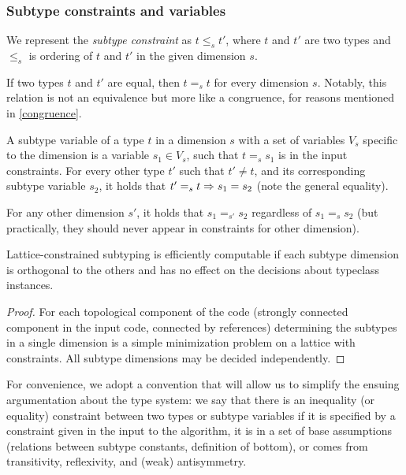 \subsubsection{Subtype constraints and variables}

We represent the \emph{subtype constraint} as $t \leq_s t'$, where $t$ and $t'$ are two types and $\leq_s$ is ordering of $t$ and $t'$ in the given dimension $s$.

If two types $t$ and $t'$ are equal, then $t =_s t$ for every dimension $s$. Notably, this relation is not an equivalence but more like a congruence, for reasons mentioned in \cref{congruence}.

\begin{defn}
    A subtype variable of a type $t$ in a dimension $s$ with a set of variables $V_s$ specific to the dimension is a variable $s_1 \in V_s$, such that $t =_s s_1$ is in the input constraints. For every other type $t'$ such that $t' \neq t$, and its corresponding subtype variable $s_2$, it holds that $t' =_s t \Rightarrow s_1 = s_2$ (note the general equality).
\end{defn}

For any other dimension $s'$, it holds that $s_1 =_{s'} s_2$ regardless of $s_1 =_s s_2$ (but practically, they should never appear in constraints for other dimension).

\begin{observe}
    Lattice-constrained subtyping is efficiently computable if each subtype dimension is orthogonal to the others and has no effect on the decisions about typeclass instances.

    \begin{proof}
        For each topological component of the code (strongly connected component in the input code, connected by references) determining the subtypes in a single dimension is a simple minimization problem on a lattice with constraints. All subtype dimensions may be decided independently.
    \end{proof}
\end{observe}

\begin{conv}
    For convenience, we adopt a convention that will allow us to simplify the ensuing argumentation about the type system: we say that there is an inequality (or equality) constraint between two types or subtype variables if it is specified by a constraint given in the input to the algorithm, it is in a set of base assumptions (relations between subtype constants, definition of bottom), or comes from transitivity, reflexivity, and (weak) antisymmetry.
\end{conv}

